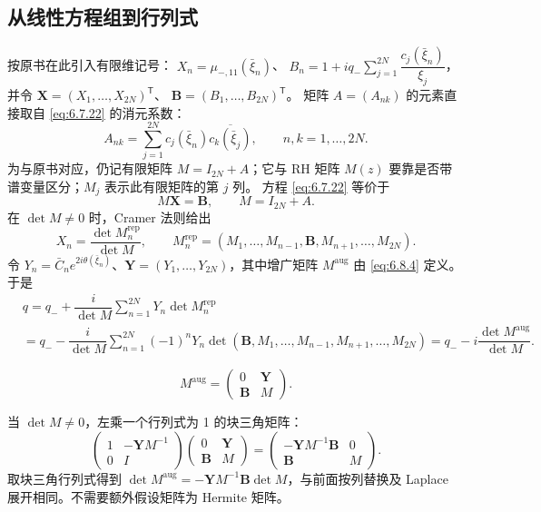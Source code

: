 \documentclass[lang=cn,scheme=chinese,mode=simple,device=normal,color=blue,
math=cm,thmcnt=section,12pt]{elegantbook}
\newcommand{\conj}[1]{\overline{#1}}
\newcommand{\eqq}[2]{\tag{#1}\label{eq:#1}#2}
\begin{document}
\subsection{从线性方程组到行列式}
按原书在此引入有限维记号：
$X_n=\mu_{-,11}(\bar\xi_n)$、
$B_n=1+iq_-\displaystyle\sum\limits_{j=1}^{2N}\dfrac{c_j(\bar\xi_n)}{\xi_j}$，
并令 $\boldsymbol X=(X_1,\ldots,X_{2N})^{\mathsf T}$、
$\boldsymbol B=(B_1,\ldots,B_{2N})^{\mathsf T}$。
矩阵 $A=(A_{nk})$ 的元素直接取自 \eqref{eq:6.7.22} 的消元系数：
\[
    A_{nk}=\sum\limits_{j=1}^{2N}c_j(\bar\xi_n)\conj{c_k(\bar\xi_j)},\qquad n,k=1,\ldots,2N.
\]
为与原书对应，仍记有限矩阵 $M=I_{2N}+A$；它与 RH 矩阵 $M(z)$ 要靠是否带谱变量区分；$M_j$ 表示此有限矩阵的第 $j$ 列。
方程 \eqref{eq:6.7.22} 等价于
\begin{equation}\eqq{6.8.1}{M\boldsymbol X=\boldsymbol B,\qquad M=I_{2N}+A.}\end{equation}
在 $\det M\ne0$ 时，Cramer 法则给出
\begin{equation}\eqq{6.8.2}{X_n=\dfrac{\det M_n^{\mathrm{rep}}}{\det M},\qquad
        M_n^{\mathrm{rep}}=(M_1,\ldots,M_{n-1},\boldsymbol B,M_{n+1},\ldots,M_{2N}).}\end{equation}
令 $Y_n=\bar C_ne^{2i\theta(\bar\xi_n)}$、$\boldsymbol Y=(Y_1,\ldots,Y_{2N})$，其中增广矩阵 $M^{\mathrm{aug}}$ 由 \eqref{eq:6.8.4} 定义。于是
\begin{equation}\eqq{6.8.3}{\begin{aligned}
             & q=q_-+\dfrac{i}{\det M}\sum\limits_{n=1}^{2N}Y_n\det M_n^{\mathrm{rep}} \\
             & =q_--\dfrac{i}{\det M}\sum\limits_{n=1}^{2N}(-1)^nY_n
            \det(\boldsymbol B,M_1,\ldots,M_{n-1},M_{n+1},\ldots,M_{2N}) =q_--i\dfrac{\det M^{\mathrm{aug}}}{\det M}.
        \end{aligned}}\end{equation}



\begin{equation}\eqq{6.8.4}{M^{\mathrm{aug}}=
        \begin{pmatrix}0&\boldsymbol Y\\\boldsymbol B&M\end{pmatrix}.}\end{equation}

\begin{callout}
    当 $\det M\ne0$，左乘一个行列式为 1 的块三角矩阵：
    \[
        \begin{pmatrix}1&-\boldsymbol YM^{-1}\\0&I\end{pmatrix}
        \begin{pmatrix}0&\boldsymbol Y\\\boldsymbol B&M\end{pmatrix}
        =\begin{pmatrix}-\boldsymbol YM^{-1}\boldsymbol B&0\\\boldsymbol B&M\end{pmatrix}.
    \]
    取块三角行列式得到 $\det M^{\mathrm{aug}}=-\boldsymbol YM^{-1}\boldsymbol B\det M$，与前面按列替换及 Laplace 展开相同。不需要额外假设矩阵为 Hermite 矩阵。
\end{callout}
\end{document}
